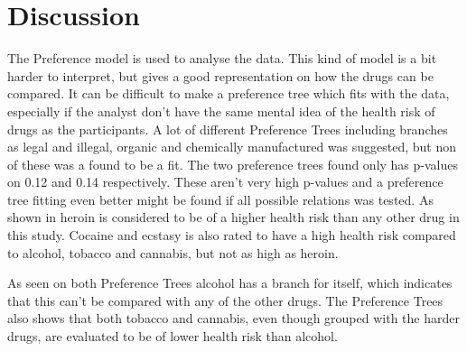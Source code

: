 \section*{Discussion}
\label{Discussion}
%
The Preference model is used to analyse the data. This kind of model is a bit harder to interpret, but gives a good representation on how the drugs can be compared. It can be difficult to make a preference tree which fits with the data, especially if the analyst don't have the same mental idea of the health risk of drugs as the participants. A lot of different Preference Trees including branches as legal and illegal, organic and chemically manufactured was suggested, but non of these was a found to be a fit. \blankline 
%
The two preference trees found only has p-values on 0.12 and 0.14 respectively. These aren't very high p-values and a preference tree fitting even better might be found if all possible relations was tested. \blankline 
%
As shown in  heroin is considered to be of a higher health risk than any other drug in this study. Cocaine and ecstasy is also rated to have a high health risk compared to alcohol, tobacco and cannabis, but not as high as heroin.

As seen on both Preference Trees alcohol has a branch for itself, which indicates that this can't be compared with any of the other drugs. The Preference Trees also shows that both tobacco and cannabis, even though grouped with the harder drugs, are evaluated to be of lower health risk than alcohol.
